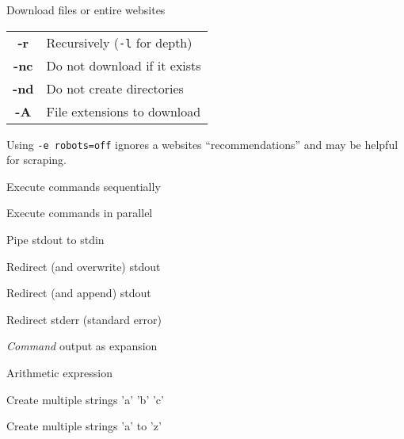 \documentclass[12pt, a4paper]
{article}
\begin{document}
\begin{multicols}{3}
		\begin{description}[nolistsep]
			\item[wget] Download files or entire websites
			\item
			\begin{tabular}{cl}
				{\large \ttfamily \textbf{-r}} & Recursively (\texttt{-l} for depth) \\
				{\large \ttfamily \textbf{-nc}} & Do not download if it exists \\
				{\large \ttfamily \textbf{-nd}} & Do not create directories \\
				{\large \ttfamily \textbf{-A}} & File extensions to download
			\end{tabular}
			
			Using \texttt{-e robots=off} ignores a websites ``recommendations'' and may be helpful for scraping.
		\end{description}
		
		
		\begin{description}[nolistsep]
			\item[\&\&] Execute commands sequentially
			\item[\&] Execute commands in parallel
			\item[|] Pipe stdout to stdin
			\item[>] Redirect (and overwrite) stdout
			\item[>>] Redirect (and append) stdout 
			\item[2>] Redirect stderr (standard error)
		\end{description}
		
		
		\begin{description}[nolistsep]
			\item[\$({\large \textit{command}})] \textit{Command} output as expansion
			\item[\$(({\large \textit{expression}}))] Arithmetic expression 
			\item[\{a,b,c\}] Create multiple strings 'a' 'b' 'c' 
			\item[\{a..z\}] Create multiple strings 'a' to 'z'
		\end{description}
		
		

\end{multicols}
\end{document}
